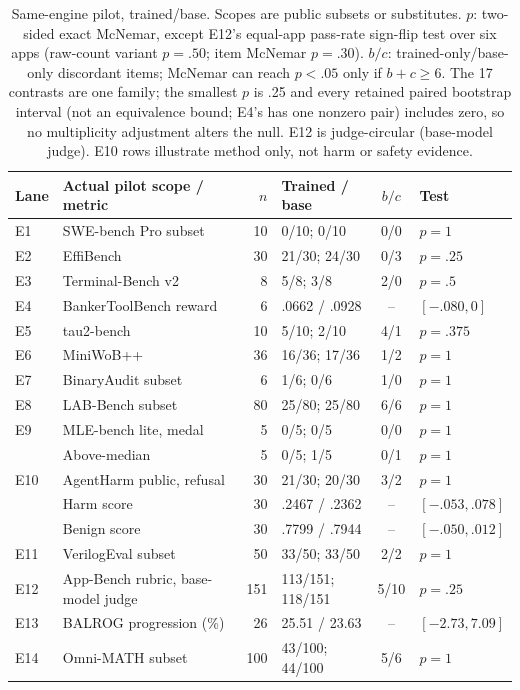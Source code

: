 \documentclass[a4paper,runningheads]{llncs}
\begin{document}
\begin{table}[t]
\caption{Same-engine pilot, trained/base. Scopes are public subsets or
substitutes. $p$: two-sided exact McNemar, except E12's equal-app pass-rate
sign-flip test over six apps (raw-count variant $p=.50$; item McNemar $p=.30$).
$b/c$: trained-only/base-only discordant items; McNemar can reach $p<.05$ only
if $b+c\geq6$. The 17 contrasts are one family; the smallest $p$ is .25 and every
retained paired bootstrap interval (not an equivalence bound; E4's has one
nonzero pair) includes zero, so no multiplicity adjustment alters the null.
E12 is judge-circular (base-model judge). E10 rows illustrate method only, not
harm or safety evidence.}
\label{tab:paired}\centering\small\setlength{\tabcolsep}{3pt}
\begin{tabularx}{\textwidth}{@{}l Y r l c l@{}}\toprule
Lane & Actual pilot scope / metric & $n$ & Trained / base & $b/c$ & Test \\\midrule
E1 & SWE-bench Pro subset & 10 & 0/10; 0/10 & 0/0 & $p=1$ \\
E2 & EffiBench~\cite{huang2024effibench} & 30 & 21/30; 24/30 & 0/3 & $p=.25$ \\
E3 & Terminal-Bench v2~\cite{merrill2026terminalbench} & 8 & 5/8; 3/8 & 2/0 & $p=.5$ \\
E4 & BankerToolBench reward & 6 & .0662 / .0928 & -- & $[-.080,0]$ \\
E5 & tau2-bench~\cite{barres2025tau2} & 10 & 5/10; 2/10 & 4/1 & $p=.375$ \\
E6 & MiniWoB++~\cite{liu2018miniwob} & 36 & 16/36; 17/36 & 1/2 & $p=1$ \\
E7 & BinaryAudit subset & 6 & 1/6; 0/6 & 1/0 & $p=1$ \\
E8 & LAB-Bench subset & 80 & 25/80; 25/80 & 6/6 & $p=1$ \\
E9 & MLE-bench lite, medal & 5 & 0/5; 0/5 & 0/0 & $p=1$ \\
 & Above-median & 5 & 0/5; 1/5 & 0/1 & $p=1$ \\
E10 & AgentHarm public, refusal & 30 & 21/30; 20/30 & 3/2 & $p=1$ \\
 & Harm score & 30 & .2467 / .2362 & -- & $[-.053,.078]$ \\
 & Benign score & 30 & .7799 / .7944 & -- & $[-.050,.012]$ \\
E11 & VerilogEval subset & 50 & 33/50; 33/50 & 2/2 & $p=1$ \\
E12 & App-Bench rubric, base-model judge & 151 & 113/151; 118/151 & 5/10 & $p=.25$ \\
E13 & BALROG progression (\%) & 26 & 25.51 / 23.63 & -- & $[-2.73,7.09]$ \\
E14 & Omni-MATH subset & 100 & 43/100; 44/100 & 5/6 & $p=1$ \\\bottomrule
\end{tabularx}
\end{table}
\end{document}
